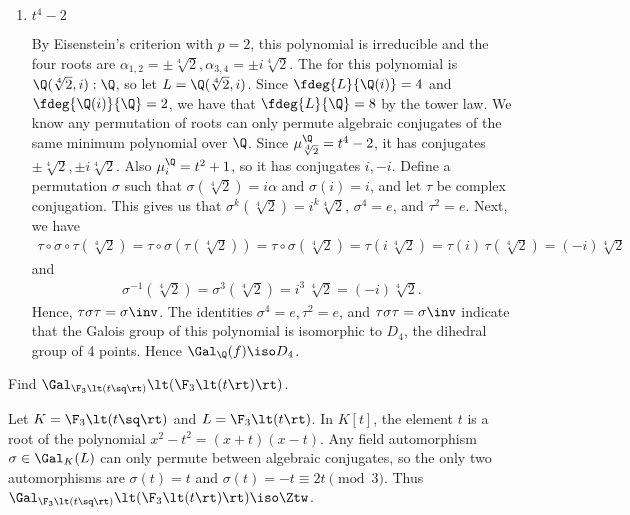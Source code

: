 \documentclass{article}
\begin{document}
\begin{enumerate}
\item \( t^4-2 \)
  \begin{solution}
    By Eisenstein's criterion with \( p=2 \), this polynomial is irreducible and the four roots are \( \alpha_{1,2} = \pm\sqrt[4]2, \alpha_{3,4}=\pm i\sqrt[4]2 \).
    The \sfe for this polynomial is \( \Q(\sqrt[4]2,i):\Q \), so let \( L = \Q(\sqrt[4]2, i) \).
    Since \( \fdeg{L}{\Q(i)} = 4 \) and \( \fdeg{\Q(i)}{\Q}=2 \), we have that \( \fdeg{L}{\Q} = 8 \) by the tower law.
    We know any permutation of roots can only permute algebraic conjugates of the same minimum polynomial over \( \Q \).
    Since \( \mu_{\sqrt[4]{2}}^\Q=t^4-2 \), it has conjugates \( \pm\sqrt[4]2,\pm i\sqrt[4]2 \).
    Also \( \mu_i^\Q=t^2+1 \), so it has conjugates \( i,-i \).
    Define a permutation \( \sigma \) such that \( \sigma(\sqrt[4]{2})=i\alpha \) and \( \sigma(i)=i \), and let \( \tau \) be complex conjugation.
    This gives us that \( \sigma^k(\sqrt[4]2) = i^k\sqrt[4]{2} \), \( \sigma^4=e \), and \( \tau^2 = e \).
    Next, we have \begin{align*}
      \tau\circ\sigma\circ\tau(\sqrt[4]{2})=\tau\circ\sigma(\tau(\sqrt[4]{2}))=\tau\circ\sigma(\sqrt[4]{2})=\tau(i\,\sqrt[4]{2})=\tau(i)\,\tau(\sqrt[4]{2})=(-i)\sqrt[4]{2}
    \end{align*}
    and
    \begin{align*}
      \sigma^{-1}(\sqrt[4]{2})=\sigma^3(\sqrt[4]{2})= i^3\,\sqrt[4]{2} = (-i)\sqrt[4]{2}.
    \end{align*}
    Hence, \( \tau\sigma\tau = \sigma\inv \).
    The identities \( \sigma^4 = e,\tau^2 = e \), and \( \tau\sigma\tau = \sigma\inv \) indicate that the Galois group of this polynomial is isomorphic to \( D_4 \), the dihedral group of 4 points.
    Hence \( \Gal_\Q(f) \iso D_4 \).
  \end{solution}
\end{enumerate}

\begin{subexercise}
  Find \( \Gal_{\F_3\lt(t\sq\rt)}\lt(\F_3\lt(t\rt)\rt) \).
\end{subexercise}
\begin{solution}
  Let \( K = \F_3\lt(t\sq\rt) \) and \( L = \F_3\lt(t\rt) \).
  In \( K[t] \), the element \( t \) is a root of the polynomial \( x^2-t^2 = (x+t)(x-t) \).
  Any field automorphism \( \sigma\in \Gal_K(L) \) can only permute between algebraic conjugates, so the only two automorphisms are \( \sigma(t) = t \) and \( \sigma(t) = -t \equiv 2t \pmod 3 \).
  Thus \( \Gal_{\F_3\lt(t\sq\rt)}\lt(\F_3\lt(t\rt)\rt) \iso \Ztw \).
\end{solution}
\end{document}
